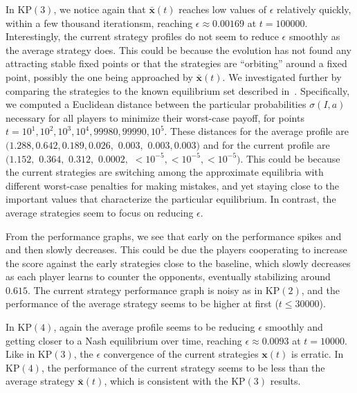 \documentclass{aamas2014}
\newcommand{\bx}{\mathbf{x}}
\begin{document}

In KP$(3)$, we notice again that $\bar{\bx}(t)$ reaches low values of $\epsilon$ relatively quickly, within 
a few thousand iterationsm, reaching $\epsilon \approx 0.00169$ at $t = 100000$. 
Interestingly, the current strategy profiles do not seem to reduce $\epsilon$ smoothly as the average strategy does. This could be because the evolution 
has not found any attracting stable fixed points or that the strategies are ``orbiting'' around a fixed point, possibly the one 
being approached by $\bar{\bx}(t)$. We investigated further by comparing the strategies to the known equilibrium set described 
in~\cite{Szafron13Kuhn}. Specifically, we computed a Euclidean distance between the particular probabilities $\sigma(I,a)$ necessary for 
all players to minimize their worst-case payoff, for points $t = 10^1, 10^2, 10^3, 10^4, 99980, 99990, 10^5$. 
These distances for the average profile are $(1.288, 0.642, 0.189, 0.026,$ $0.003,$ $0.003, 0.003)$ and for the current profile are
$(1.152,$ $0.364,$ $0.312,$ $0.0002,$ $ <10^{-5},  <10^{-5},  <10^{-5})$. This could be because the
current strategies are switching among the approximate equilibria with different worst-case penalties for making mistakes, 
and yet staying close to the important values that characterize the particular equilibrium.  
In contrast, the average strategies seem to focus on reducing $\epsilon$. 

From the performance graphs, we see that early on the performance spikes and 
and then slowly decreases. This could be due the players cooperating to increase the score against the early 
strategies close to the baseline, which slowly decreases as each player learns to counter the opponents, 
eventually stabilizing around $0.615$. The current strategy
performance graph is noisy as in KP$(2)$, and the performance of the average strategy seems to be higher at first ($t \le 30000$). 

In KP$(4)$, again the average profile seems to be reducing $\epsilon$ smoothly and getting closer to a Nash equilibrium 
over time, reaching $\epsilon \approx 0.0093$ at $t = 10000$. 
Like in KP$(3)$, the $\epsilon$ convergence of the current strategies $\bx(t)$ is erratic. 
In KP$(4)$, the performance of the current strategy seems to be less than the average 
strategy $\bar{\bx}(t)$, which is consistent with the KP$(3)$ results. 
\end{document}
